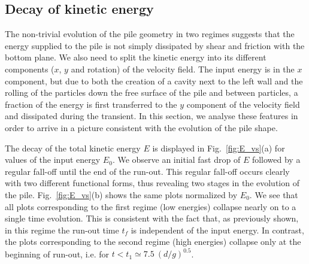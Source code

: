 \subsection{Decay of kinetic energy}
\label{sec:decay}

The non-trivial evolution of the pile geometry  in two regimes suggests that 
the energy supplied to the pile is not simply dissipated by shear and friction 
with the bottom plane. We also need to split the kinetic energy into its 
different components ($x$, $y$ and rotation) of the velocity field. The input 
energy is in the $x$ component, but due to both the creation of a cavity next 
to the left wall and the rolling of the particles down the free surface of the 
pile and between particles, a fraction of the energy is first transferred to 
the $y$ component of the velocity field and dissipated  during the transient. 
In this section, we analyse these features  in order to arrive in a picture 
consistent with the evolution of the pile shape.  

The decay of the total kinetic energy $E$ is displayed in 
Fig.~\ref{fig:E_vs}(a) for values of the input energy $E_0$. We observe an 
initial fast drop of $E$ followed by a regular fall-off until the end of the 
run-out. This regular fall-off occurs clearly with two different functional 
forms, thus revealing two stages in the evolution of the pile. 
Fig.~\ref{fig:E_vs}(b) shows the same plots normalized by $E_0$. We see that 
all plots corresponding to the first regime (low energies) collapse nearly on 
to a single time evolution. 
This is consistent with the fact that, as previously shown, in this 
regime the run-out time $t_f$ is independent of the input energy. In contrast, 
the plots corresponding to the second regime (high energies) collapse only at 
the beginning of run-out, i.e. for $t < t_1 \simeq 7.5 \ (d/g)^{0.5}$.   

